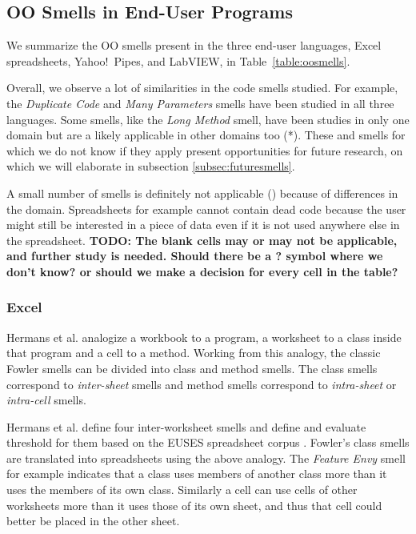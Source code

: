 \documentclass[10pt,conference,compsocconf]{IEEEtran}
\newcommand{\todo}[1]{\textbf{TODO: #1}}
\begin{document}
\subsection{OO Smells in End-User Programs}
 We summarize the OO smells present in the three end-user languages, Excel spreadsheets, Yahoo!\ Pipes, and LabVIEW, in Table~\ref{table:oosmells}.
 
 Overall, we observe a lot of similarities in the code smells studied. For example, the \emph{Duplicate Code} and \emph{Many Parameters} smells have been studied in all three languages. Some smells, like the \emph{Long Method} smell, have been studies in only one domain but are a likely applicable in other domains too (*). These and smells for which we do not know if they apply present opportunities for future research, on which we will elaborate in subsection \ref{subsec:futuresmells}.
 
 A small number of smells is definitely not applicable () because of differences in the domain. Spreadsheets for example cannot contain dead code because the user might still be interested in a piece of data even if it is not used anywhere else in the spreadsheet.
\todo{The blank cells may or may not be applicable, and further study is needed. Should there be a ? symbol where we don't know? or should we make a decision for every cell in the table?}
 
 \subsubsection{Excel}
Hermans et al. \cite{Hermans2012inter} \cite{Hermans2012intra} analogize a workbook to a program, a worksheet to a class inside that program and a cell to a method.
Working from this analogy, the classic Fowler smells can be divided into class and method smells.
The class smells correspond to \textit{inter-sheet} smells and method smells correspond to \textit{intra-sheet} or \textit{intra-cell} smells.

Hermans et al. \cite{Hermans2012inter} define four inter-worksheet smells and define and evaluate threshold for them based on the EUSES spreadsheet corpus \cite{fisher2005euses}.
Fowler's class smells are translated into spreadsheets using the above analogy. 
The \textit{Feature Envy} smell for example indicates that a class uses members of another class more than it uses the members of its own class.
Similarly a cell can use cells of other worksheets more than it uses those of its own sheet, and thus that cell could better be placed in the other sheet.
\end{document}
